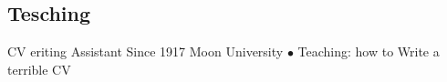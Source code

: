 \documentclass[
	a4paper,
]{ThirtyNinesecondscv}
\begin{document}
\subsection{Tesching}
\begin{cvtable}[1.5]
	\customcvitem
                    {\faBriefcase}
                    {CV eriting Assistant}
                    {Since 1917}
                    {Moon University}
                    {
                    $\bullet$ Teaching: how to Write a terrible CV 
                        }
        
\end{cvtable}






\begin{cvtable}

\end{cvtable}

\cvsignature
\end{document}
